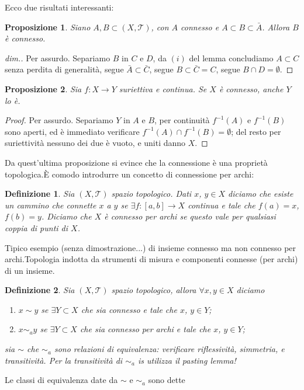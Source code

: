 \documentclass[10pt,a4paper]{article}
\theoremstyle{ilemma}
\theoremstyle{plain}
\theoremstyle{plain}
\newtheorem*{proposition}{Proposizione}
\theoremstyle{iother}
\theoremstyle{icorollary}
\theoremstyle{numcorollary}
\theoremstyle{plain}
\newtheorem*{definition}{Definizione}
\begin{document}
Ecco due risultati interessanti:
\begin{proposition} Siano $A,B\subset (X,\mathcal T)$, con $A$ connesso e
$A\subset B\subset\bar A$. Allora $B$ \`e connesso.
\end{proposition}
\begin{proof}[dim.]
  Per assurdo. Separiamo $B$ in $C$ e $D$, da $(i)$ del lemma concludiamo
  $A\subset C$ senza perdita di generalit\`a, segue $\bar A\subset\bar C$, segue
  $B\subset\bar C = C$, segue $B\cap D =\emptyset$.
\end{proof}
\begin{proposition}
  Sia $f:X\to Y$ suriettiva e continua. Se $X$ \`e connesso, anche $Y$ lo \`e.
\end{proposition}
\begin{proof}
  Per assurdo. Separiamo $Y$ in $A$ e $B$, per continuit\`a $f^{-1}(A)$ e
  $f^{-1}(B)$ sono aperti, ed \`e immediato verificare $f^{-1}(A)\cap
  f^{-1}(B)=\emptyset$; del resto per suriettivit\`a nessuno dei due \`e vuoto,
  e uniti danno $X$.
\end{proof} Da quest'ultima proposizione si evince che la connessione \`e una
propriet\`a topologica.\newline \`E comodo introdurre un concetto di connessione
per archi:
\begin{definition}
  Sia $(X, \mathcal T)$ spazio topologico. Dati $x$, $y\in X$ diciamo che esiste
  un cammino che connette $x$ a $y$ se $\exists f:[a,b]\to X$ continua e tale
  che $f(a)=x$, $f(b)=y$. Diciamo che $X$ \`e connesso per archi se questo vale
  per qualsiasi coppia di punti di $X$.
\end{definition} Tipico esempio (senza dimostrazione...) di insieme connesso ma
non connesso per archi.\newline Topologia indotta da strumenti di misura e
componenti connesse (per archi) di un insieme.
\begin{definition}Sia $(X,\mathcal T)$ spazio topologico, allora $\forall x,y\in
X$ diciamo
  \begin{enumerate}
  \item $x\sim y$ se $\exists Y\subset X$ che sia connesso e tale che $x$, $y\in
  Y$;
  \item $x\sim_a y$ se $\exists Y\subset X$ che sia connesso per archi e tale
  che $x$, $y\in Y$;
  \end{enumerate} sia $\sim$ che $\sim_a$ sono relazioni di equivalenza:
  verificare riflessivit\`a, simmetria, e transitivit\`a. Per la transitivit\`a
  di $\sim_a$ is utilizza il pasting lemma!
\end{definition} Le classi di equivalenza date da $\sim$ e $\sim_a$ sono dette
\end{document}
